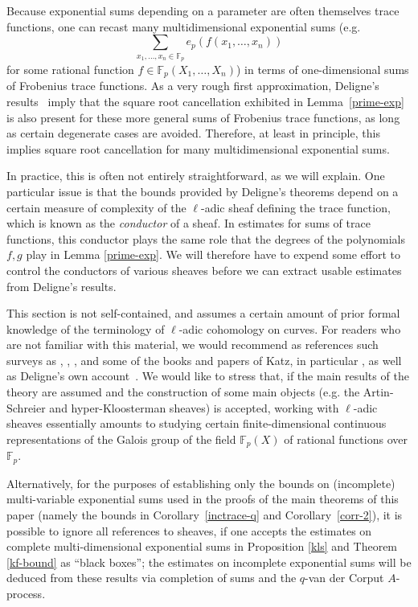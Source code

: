 \documentclass[12pt,a4paper,reqno]{amsart}
\numberwithin{equation}{section}
\theoremstyle{plain}
\theoremstyle{definition}
\newcommand\F{\mathbb{F}}
\newcommand\Fp{\F_{p}}
\begin{document}
Because exponential sums depending on a parameter are often themselves
trace functions, one can recast many multidimensional exponential sums
(e.g.
$$
\sum_{x_1,\ldots,x_n \in \Fp} e_p(f(x_1,\ldots,x_n))
$$ 
for some rational function $f\in\Fp(X_1,\ldots,X_n)$) in terms of
one-dimensional sums of Frobenius trace functions. As a very rough
first approximation, Deligne's results~\cite{WeilII} imply that the
square root cancellation exhibited in Lemma~\ref{prime-exp} is also
present for these more general sums of Frobenius trace functions, as
long as certain degenerate cases are avoided.  Therefore, at least
in principle, this implies square root cancellation for many
multidimensional exponential sums.  
\par
In practice, this is often not entirely straightforward, as we will
explain. One particular issue is that the bounds provided by Deligne's
theorems depend on a certain measure of complexity of the $\ell$-adic
sheaf defining the trace function, which is known as the
\emph{conductor} of a sheaf. In estimates for sums of trace functions,
this conductor plays the same role that the degrees of the polynomials
$f,g$ play in Lemma \ref{prime-exp}.  We will therefore have to expend
some effort to control the conductors of various sheaves before we can
extract usable estimates from Deligne's results.

This section is not self-contained, and assumes a certain amount of
prior formal knowledge of the terminology of $\ell$-adic cohomology on
curves. For readers who are not familiar with this material, we would
recommend as references such surveys as \cite[\S 11.11]{ik},
\cite{exp-rism}, \cite{pizza}, and some of the books and papers of
Katz, in particular \cite{katz-sommes, katzWII, GKM}, as well as
Deligne's own account~\cite[Sommes trig.]{deligne41/2}. We would like
to stress that, if the main results of the theory are assumed and the
construction of some main objects (e.g. the Artin-Schreier and
hyper-Kloosterman sheaves) is accepted, working with $\ell$-adic
sheaves essentially amounts to studying
certain %
finite-dimensional continuous representations of the Galois group of the field
$\Fp(X)$ of rational functions over $\Fp$.  
\par
Alternatively, for the purposes of establishing only the bounds on
(incomplete) multi-variable exponential sums used in the proofs of the
main theorems of this paper (namely the bounds in Corollary~\ref{inctrace-q} and 
Corollary~\ref{corr-2}), it is possible to ignore all
references to sheaves, if one accepts the estimates on complete
multi-dimensional exponential sums in Proposition \ref{kls} and
Theorem \ref{kf-bound} as ``black boxes''; the estimates on  incomplete
exponential sums will be deduced from these results via completion of sums and the
$q$-van der Corput $A$-process.
\end{document}
